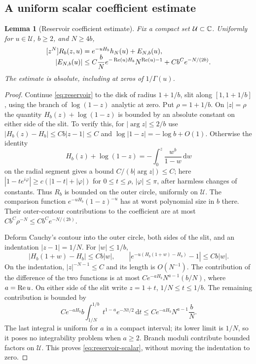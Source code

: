 \documentclass[11pt]{article}
\newtheorem{lemma}[theorem]{Lemma}
\theoremstyle{definition}\newtheorem{definition}[theorem]{Definition}
\theoremstyle{remark}\newtheorem{remark}[theorem]{Remark}
\newcommand{\dd}{\,\mathrm d}\newcommand{\ind}{\mathbf1}
\numberwithin{equation}{section}\allowdisplaybreaks
\begin{document}
\subsection{A uniform scalar coefficient estimate}
\begin{lemma}[Reservoir coefficient estimate]\label{lem:reservoir}
Fix a compact set $\mathcal U\subset\mathbb C$. Uniformly for $u\in\mathcal U$,
$b\ge2$, and $N\ge4b$,
\begin{align}\label{eq:reservoir-scalar}
 [z^N]R_b(z,u)
 &=e^{-uH_b}h_N(u)+E_{N,b}(u),\\[-2mm]
 |E_{N,b}(u)|
 &\le C\frac bN e^{-\operatorname{Re}(u)H_b}N^{\operatorname{Re}(u)-1}
       +Cb^C e^{-N/(2b)}.\nonumber
\end{align}
The estimate is absolute, including at zeros of $1/\Gamma(u)$.
\end{lemma}
\begin{proof}
Continue \eqref{eq:reservoir} to the disk of radius $1+1/b$, slit along
$[1,1+1/b]$, using the branch of $\log(1-z)$ analytic at zero. Put
$\rho=1+1/b$. On $|z|=\rho$ the quantity
$H_b(z)+\log(1-z)$ is bounded by an absolute constant on either side
of the slit. To verify this, for $|\arg z|\le2/b$ use
$|H_b(z)-H_b|\le Cb|z-1|\le C$ and
$\log|1-z|=-\log b+O(1)$. Otherwise the identity
\[
 H_b(z)+\log(1-z)=-\int_0^z\frac{w^b}{1-w}\dd w
\]
on the radial segment gives a bound $C/(b|\arg z|)\le C$; here
$|1-te^{i\varphi}|\ge c(|1-t|+|\varphi|)$ for
$0\le t\le\rho$, $|\varphi|\le\pi$, after harmless changes of constants.
Thus $R_b$ is bounded on the outer circle, uniformly on $\mathcal U$.
The comparison function $e^{-uH_b}(1-z)^{-u}$ has at worst polynomial
size in $b$ there. Their outer-contour contributions to the coefficient
are at most $Cb^C\rho^{-N}\le Cb^C e^{-N/(2b)}$.

Deform Cauchy's contour into the outer circle, both sides of the slit,
and an indentation $|z-1|=1/N$. For $|w|\le1/b$,
\[
 |H_b(1+w)-H_b|\le Cb|w|,\qquad
 |e^{-u(H_b(1+w)-H_b)}-1|\le Cb|w|.
\]
On the indentation, $|z|^{-N-1}\le C$ and its length is $O(N^{-1})$.
The contribution of the difference of the two functions is at most
$Ce^{-aH_b}N^{a-1}(b/N)$, where $a=\operatorname{Re} u$. On either side of the slit
write $z=1+t$, $1/N\le t\le1/b$. The remaining contribution is bounded by
\[
 Ce^{-aH_b}b\int_{1/N}^{1/b}t^{1-a}e^{-Nt/2}\dd t
 \le Ce^{-aH_b}N^{a-1}\frac bN.
\]
The last integral is uniform for $a$ in a compact interval; its lower
limit is $1/N$, so it poses no integrability problem when $a\ge2$.
Branch moduli contribute bounded factors on $\mathcal U$. This proves
\eqref{eq:reservoir-scalar}, without moving the indentation to zero.


\end{proof}
\end{document}
